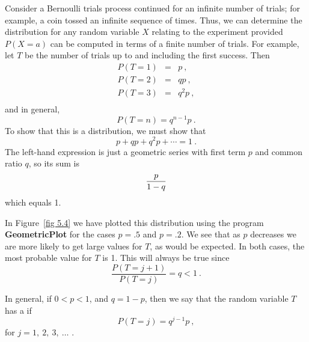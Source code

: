 Consider a Bernoulli trials process continued for an infinite number of trials; for
example, a coin tossed an infinite sequence of times.  
  Thus, we can determine the distribution for any random
variable $X$ relating to the experiment provided
$P(X = a)$ can be computed in terms of a finite number of trials.  For example, let $T$ be
the number of trials up to and including the first success.  Then
\begin{eqnarray*} P(T = 1) & = & p\ , \\ P(T = 2) & = & qp\ , \\ P(T = 3) & = & q^2p\ , \\
\end{eqnarray*}
and in general,
$$P(T = n) = q^{n-1}p\ .$$ 
To show that this is a distribution, we must show that
$$ p + qp + q^2p + \cdots = 1\ .
$$ 
The left-hand expression is just a geometric series with first term $p$ and common
ratio $q$, so its sum is
$${p\over{1-q}}$$ which equals 1.
\par In Figure~\ref{fig 5.4} we have plotted this distribution using the program {\bf
GeometricPlot} for the cases $p = .5$ and $p = .2$.  We see that as $p$ decreases we
are more likely to get large values for $T$, as would be expected.  In both cases, the
most probable value for $T$ is 1.  This will always be true since
$$
\frac {P(T = j + 1)}{P(T = j)} = q < 1\ .
$$
\par
In general, if $0 < p < 1$, and $q = 1 - p$, then we say that the random variable $T$
has a  if
$$P(T = j) = q^{j - 1}p\ ,$$ for $j = 1,\ 2,\ 3,\ \ldots$ .

